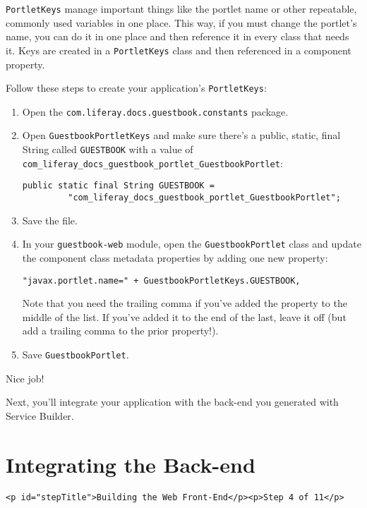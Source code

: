 \texttt{PortletKeys} manage important things like the portlet name or
other repeatable, commonly used variables in one place. This way, if you
must change the portlet's name, you can do it in one place and then
reference it in every class that needs it. Keys are created in a
\texttt{PortletKeys} class and then referenced in a component property.

Follow these steps to create your application's \texttt{PortletKeys}:

\begin{enumerate}
\def\labelenumi{\arabic{enumi}.}
\item
  Open the \texttt{com.liferay.docs.guestbook.constants} package.
\item
  Open \texttt{GuestbookPortletKeys} and make sure there's a public,
  static, final String called \texttt{GUESTBOOK} with a value of
  \texttt{com\_liferay\_docs\_guestbook\_portlet\_GuestbookPortlet}:

\begin{verbatim}
public static final String GUESTBOOK =
         "com_liferay_docs_guestbook_portlet_GuestbookPortlet";
\end{verbatim}
\item
  Save the file.
\item
  In your \texttt{guestbook-web} module, open the
  \texttt{GuestbookPortlet} class and update the component class
  metadata properties by adding one new property:

\begin{verbatim}
"javax.portlet.name=" + GuestbookPortletKeys.GUESTBOOK,
\end{verbatim}

  Note that you need the trailing comma if you've added the property to
  the middle of the list. If you've added it to the end of the last,
  leave it off (but add a trailing comma to the prior property!).
\item
  Save \texttt{GuestbookPortlet}.
\end{enumerate}

Nice job!

Next, you'll integrate your application with the back-end you generated
with Service Builder.

\chapter{Integrating the Back-end}\label{integrating-the-back-end}

\begin{verbatim}
<p id="stepTitle">Building the Web Front-End</p><p>Step 4 of 11</p>
\end{verbatim}


